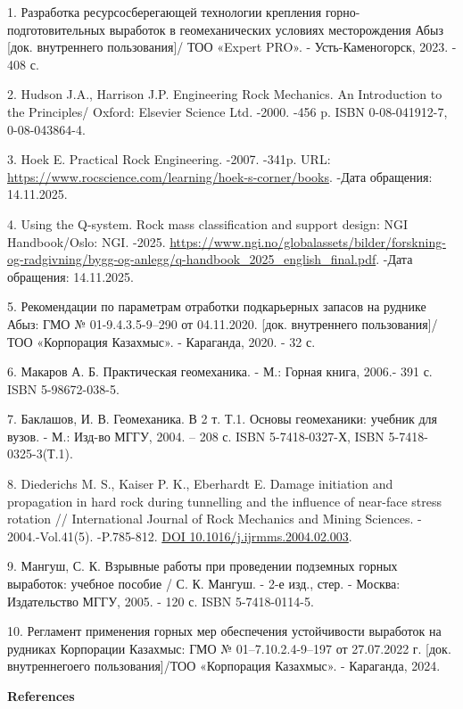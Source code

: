 \begin{refs}
1. Разработка ресурсосберегающей технологии крепления
горно-подготовительных выработок в геомеханических условиях
месторождения Абыз {[}док. внутреннего пользования{]}/ ТОО «Expert
PRO». - Усть-Каменогорск, 2023. - 408 с.

2. Hudson J.A., Harrison J.P. Engineering Rock Mechanics. An
Introduction to the Principles/ Oxford: Elsevier Science Ltd. -2000.
-456 p. ISBN 0-08-041912-7, 0-08-043864-4.

3. Hoek E. Practical Rock Engineering. -2007. -341p. URL:
\url{https://www.rocscience.com/learning/hoek-s-corner/books}. -Дата
обращения: 14.11.2025.

4. Using the Q-system. Rock mass classification and support design:
NGI Handbook/Oslo: NGI. -2025.
\url{https://www.ngi.no/globalassets/bilder/forskning-og-radgivning/bygg-og-anlegg/q-handbook_2025_english_final.pdf}.
-Дата обращения: 14.11.2025.

5. Рекомендации по параметрам отработки подкарьерных запасов на
руднике Абыз: ГМО № 01-9.4.3.5-9--290 от 04.11.2020. {[}док.
внутреннего пользования{]}/ТОО «Корпорация Казахмыс». - Караганда,
2020. - 32 с.

6. Макаров А. Б. Практическая геомеханика. - М.: Горная книга, 2006.-
391 с. ISBN 5-98672-038-5.

7. Баклашов, И. В. Геомеханика. В 2 т. Т.1. Основы геомеханики:
учебник для вузов. - М.: Изд-во МГГУ, 2004. -- 208 с. ISBN
5-7418-0327-Х, ISBN 5-7418-0325-3(Т.1).

8. Diederichs M. S., Kaiser P. K., Eberhardt E. Damage initiation and
propagation in hard rock during tunnelling and the influence of
near-face stress rotation // International Journal of Rock Mechanics
and Mining Sciences. - 2004.-Vol.41(5). -P.785-812.
\href{https://doi.org/10.1016/j.ijrmms.2004.02.003}{DOI
10.1016/j.ijrmms.2004.02.003}.

9. Мангуш, С. К. Взрывные работы при проведении подземных горных
выработок: учебное пособие / С. К. Мангуш. - 2-е изд., стер. - Москва:
Издательство МГГУ, 2005. - 120 с. ISBN 5-7418-0114-5.

10. Регламент применения горных мер обеспечения устойчивости выработок на
рудниках Корпорации Казахмыс: ГМО № 01--7.10.2.4-9--197 от 27.07.2022 г.
{[}док. внутреннегоего пользования{]}/ТОО «Корпорация Казахмыс». -
Караганда, 2024.
\end{refs}

\begin{center}
{\bfseries References}
\end{center}

